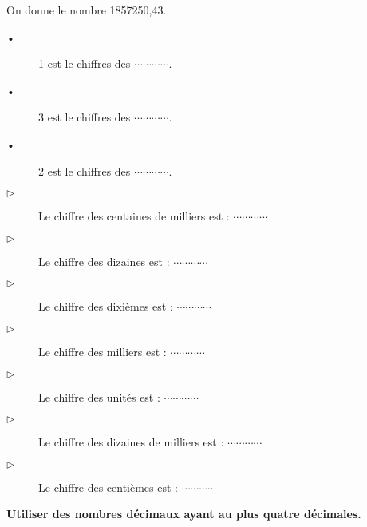 On donne le  nombre 1857250,43. 
\begin{description}
\item[•] 1 est le chiffres des $ \cdots\cdots\cdots\cdots $.
\item[•] 3 est le chiffres des $ \cdots\cdots\cdots\cdots $.
\item[•] 2 est le chiffres des $ \cdots\cdots\cdots\cdots $.

\item[$\triangleright$] Le chiffre des centaines de milliers est : $ \cdots\cdots\cdots\cdots $
\item[$\triangleright$] Le chiffre des dizaines est : $ \cdots\cdots\cdots\cdots $
\item[$\triangleright$] Le chiffre des dixièmes est : $ \cdots\cdots\cdots\cdots $
\item[$\triangleright$] Le chiffre des milliers est :  $ \cdots\cdots\cdots\cdots $
\item[$\triangleright$] Le chiffre des unités est : $ \cdots\cdots\cdots\cdots $
\item[$\triangleright$] Le chiffre des dizaines de milliers est : $ \cdots\cdots\cdots\cdots $
\item[$\triangleright$] Le chiffre des centièmes est : $ \cdots\cdots\cdots\cdots $

\end{description}







\textbf{Utiliser des nombres décimaux ayant au plus quatre décimales.}


